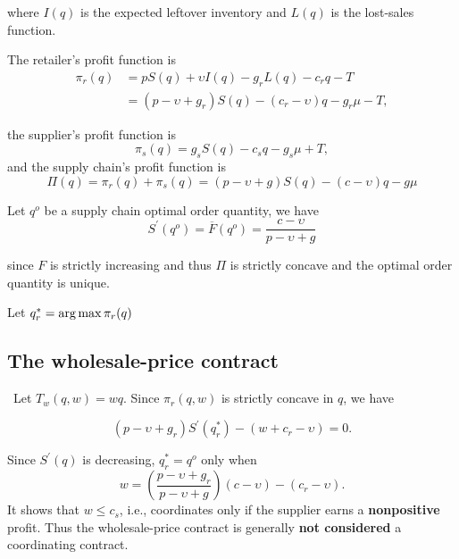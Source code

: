 where $I(q)$ is the expected leftover inventory and $L(q)$ is the lost-sales function.

The retailer's profit function is 
\begin{align*}
    \pi_r(q)&=pS(q)+\upsilon I(q)-g_r L(q)-c_r q - T\\
    &=(p-\upsilon+g_r)S(q)-(c_r-\upsilon)q-g_r\mu-T,
\end{align*}

the supplier's profit function is 
\begin{equation*}
    \pi_s(q)=g_s S(q)-c_s q-g_s\mu + T,
\end{equation*}
and the supply chain's profit function is 
\begin{equation}
    \Pi(q)=\pi_r(q)+\pi_s(q)=(p-\upsilon+g)S(q)-(c-\upsilon)q-g\mu
\end{equation}

Let $q^o$ be a supply chain optimal order quantity, we have 
\begin{equation}
    S^\prime(q^o)=\overline F(q^o)=\frac{c-\upsilon}{p-\upsilon+g}
\end{equation}

since $F$ is strictly increasing and thus $\Pi$ is strictly concave and the optimal order quantity is unique.

Let $q_r^*=\operatorname*{arg\,max} \pi_r(q)$

\subsection{The wholesale-price contract}\
Let $T_w(q,w)=w q$. Since $\pi_r(q,w)$ is strictly concave in $q$, we have 

\begin{equation}
    (p-\upsilon+g_r)S^\prime(q_r^*)-(w+c_r-\upsilon)=0.
\end{equation}

Since $S^\prime(q)$ is decreasing, $q_r^*=q^o$ only when
$$
w=(\frac{p-\upsilon+g_r}{p-\upsilon+g})(c-\upsilon)-(c_r-\upsilon).
$$
It shows that $w\leq c_s$, i.e., coordinates only if the supplier earns a \textbf{nonpositive} profit. Thus the wholesale-price contract is generally \textbf{not considered} a coordinating contract.











   